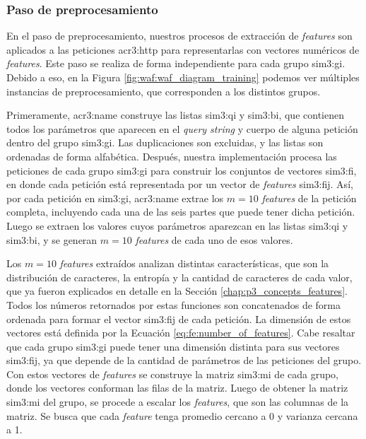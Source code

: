 \subsubsection{Paso de preprocesamiento}

En el paso de preprocesamiento, nuestros procesos de extracción de
\textit{features} son aplicados a las peticiones \gls{acr3:http} para
representarlas con vectores numéricos de \textit{features}.
Este paso se realiza de forma independiente para cada grupo \gls{sim3:gi}.
Debido a eso, en la Figura \ref{fig:waf:waf_diagram_training} podemos ver
múltiples instancias de preprocesamiento, que corresponden a los distintos
grupos.

Primeramente, \gls{acr3:name} construye las listas
\gls{sim3:qi} y \gls{sim3:bi}, que contienen todos los parámetros que
aparecen en el \textit{query string} y cuerpo de alguna petición dentro
del grupo \gls{sim3:gi}. Las duplicaciones son excluidas, y las listas
son ordenadas de forma alfabética.
Después, nuestra implementación procesa las peticiones de cada grupo
\gls{sim3:gi} para construir los conjuntos de vectores \gls{sim3:fi},
en donde cada petición está representada por un vector de \textit{features}
\gls{sim3:fij}. Así, por cada petición en \gls{sim3:gi}, \gls{acr3:name}
extrae los $m = 10$ \textit{features} de la petición completa, incluyendo
cada una de las seis partes que puede tener dicha petición. Luego se
extraen los valores cuyos parámetros aparezcan en las listas \gls{sim3:qi}
y \gls{sim3:bi}, y se generan $m = 10$ \textit{features} de cada uno de
esos valores.

Los $m = 10$ \textit{features} extraídos analizan distintas características,
que son la distribución de caracteres, la entropía y la cantidad de
caracteres de cada valor, que ya fueron explicados en detalle en la
Sección \ref{chap:p3_concepts_features}.
Todos los números retornados por estas funciones son concatenados de forma
ordenada para formar el vector \gls{sim3:fij} de cada petición. La dimensión
de estos vectores está definida por la Ecuación \ref{eq:fe:number_of_features}.
Cabe resaltar que cada grupo \gls{sim3:gi} puede tener una dimensión
distinta para sus vectores \gls{sim3:fij}, ya que depende de la cantidad
de parámetros de las peticiones del grupo.
Con estos vectores de \textit{features} se construye la matriz \gls{sim3:mi}
de cada grupo, donde los vectores conforman las filas de la matriz.
Luego de obtener la matriz \gls{sim3:mi} del grupo, se procede a escalar
los \textit{features}, que son las columnas de la matriz. Se busca que
cada \textit{feature} tenga promedio cercano a 0 y varianza cercana a 1.

